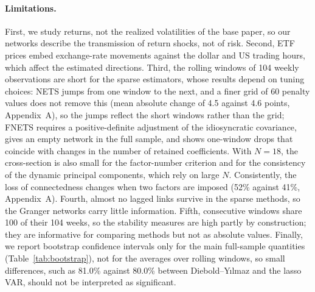 \paragraph{Limitations.}
First, we study returns, not the realized volatilities of the base paper, so our networks describe the transmission of return shocks, not of risk. Second, ETF prices embed exchange-rate movements against the dollar and US trading hours, which affect the estimated directions. Third, the rolling windows of 104 weekly observations are short for the sparse estimators, whose results depend on tuning choices: NETS jumps from one window to the next, and a finer grid of 60 penalty values does not remove this (mean absolute change of 4.5 against 4.6 points, Appendix~A), so the jumps reflect the short windows rather than the grid; FNETS requires a positive-definite adjustment of the idiosyncratic covariance, gives an empty network in the full sample, and shows one-window drops that coincide with changes in the number of retained coefficients. With $N = 18$, the cross-section is also small for the factor-number criterion and for the consistency of the dynamic principal components, which rely on large $N$. Consistently, the loss of connectedness changes when two factors are imposed (52\% against 41\%, Appendix~A). Fourth, almost no lagged links survive in the sparse methods, so the Granger networks carry little information. Fifth, consecutive windows share 100 of their 104 weeks, so the stability measures are high partly by construction; they are informative for comparing methods but not as absolute values. Finally, we report bootstrap confidence intervals only for the main full-sample quantities (Table~\ref{tab:bootstrap}), not for the averages over rolling windows, so small differences, such as 81.0\% against 80.0\% between Diebold--Y{\i}lmaz and the lasso VAR, should not be interpreted as significant.

